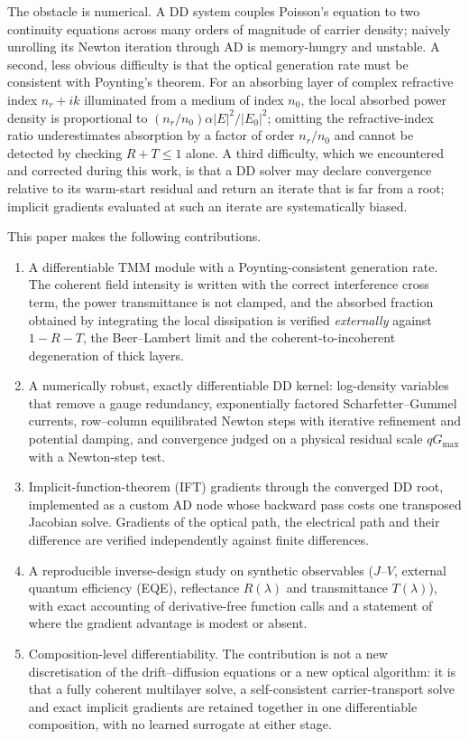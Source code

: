 \documentclass[preprint,12pt]{elsarticle}
\begin{document}
The obstacle is numerical. A DD system couples Poisson's equation to two
continuity equations across many orders of magnitude of carrier density;
naively unrolling its Newton iteration through AD is memory-hungry and
unstable. A second, less obvious difficulty is that the optical generation
rate must be consistent with Poynting's theorem. For an absorbing layer of
complex refractive index $n_r+ik$ illuminated from a medium of index $n_0$,
the local absorbed power density is proportional to
$(n_r/n_0)\alpha|E|^2/|E_0|^2$; omitting the refractive-index ratio
underestimates absorption by a factor of order $n_r/n_0$ and cannot be
detected by checking $R+T\le 1$ alone. A third difficulty, which we
encountered and corrected during this work, is that a DD solver may declare
convergence relative to its warm-start residual and return an iterate that is
far from a root; implicit gradients evaluated at such an iterate are
systematically biased.

This paper makes the following contributions.

\begin{enumerate}
\item A differentiable TMM module with a Poynting-consistent generation rate.
  The coherent field intensity is written with the correct interference cross
  term, the power transmittance is not clamped, and the absorbed fraction
  obtained by integrating the local dissipation is verified \emph{externally}
  against $1-R-T$, the Beer--Lambert limit and the coherent-to-incoherent
  degeneration of thick layers.
\item A numerically robust, exactly differentiable DD kernel: log-density
  variables that remove a gauge redundancy, exponentially factored
  Scharfetter--Gummel currents, row--column equilibrated Newton steps with
  iterative refinement and potential damping, and convergence judged on a
  physical residual scale $qG_{\max}$ with a Newton-step test.
\item Implicit-function-theorem (IFT) gradients through the converged DD root,
  implemented as a custom AD node whose backward pass costs one transposed
  Jacobian solve. Gradients of the optical path, the electrical path and their
  difference are verified independently against finite differences.
\item A reproducible inverse-design study on synthetic observables
  ($J$--$V$, external quantum efficiency (EQE), reflectance $R(\lambda)$ and
  transmittance $T(\lambda)$), with exact accounting of derivative-free function calls
  and a statement of where the gradient advantage is modest or absent.
\item Composition-level differentiability. The contribution is not a
  new discretisation of the drift--diffusion equations or a new optical
  algorithm: it is that a fully coherent multilayer solve, a
  self-consistent carrier-transport solve and exact implicit gradients
  are retained together in one differentiable composition, with no
  learned surrogate at either stage.
\end{enumerate}
\end{document}
